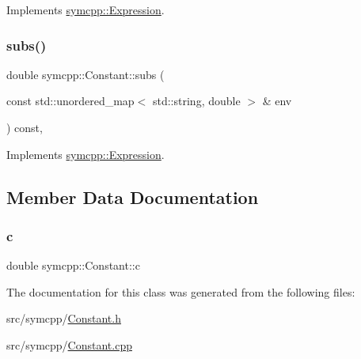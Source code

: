 Implements \mbox{\hyperlink{classsymcpp_1_1Expression_ab1fa6e55eea0682250d013f28db26cd2}{symcpp\+::\+Expression}}.

\mbox{\label{classsymcpp_1_1Constant_ac6f62c3945429d0d318dc7d366dd4b54}} 
\subsubsection{\texorpdfstring{subs()}{subs()}}
{\footnotesize\ttfamily double symcpp\+::\+Constant\+::subs (\begin{DoxyParamCaption}\item[{const std\+::unordered\+\_\+map$<$ std\+::string, double $>$ \&}]{env }\end{DoxyParamCaption}) const\hspace{0.3cm}{\ttfamily [override]}, {\ttfamily [virtual]}}



Implements \mbox{\hyperlink{classsymcpp_1_1Expression_aaef29b0afa2d6c21fe35f47a1be76134}{symcpp\+::\+Expression}}.



\subsection{Member Data Documentation}
\mbox{\label{classsymcpp_1_1Constant_aff65de7395c014b7544c285bc131b336}} 
\subsubsection{\texorpdfstring{c}{c}}
{\footnotesize\ttfamily double symcpp\+::\+Constant\+::c\hspace{0.3cm}{\ttfamily [private]}}



The documentation for this class was generated from the following files\+:\begin{DoxyCompactItemize}
\item 
src/symcpp/\mbox{\hyperlink{Constant_8h}{Constant.\+h}}\item 
src/symcpp/\mbox{\hyperlink{Constant_8cpp}{Constant.\+cpp}}\end{DoxyCompactItemize}
